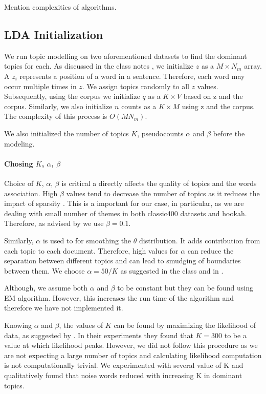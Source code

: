 \documentclass[11pt,a4paper,oneside]{article}
\begin{document}
Mention complexities of algorithms.

\subsection{LDA Initialization}
We run topic modelling on two aforementioned datasets to find the dominant topics for each. As discussed in the class notes \cite{classNotes}, we initialize $z$ as a $M \times N_m$ array. A $z_i$ represents a position of a word in a sentence. Therefore, each word may occur multiple times in $z$. We assign topics randomly to all $z$ values.  Subsequently, using the corpus we initialize $q$ as a $K \times V$ based on z and the corpus. Similarly, we also initialize $n$ counts as a $K \times M$ using z and the corpus. The complexity of this process is $O(MN_m)$.

We also initialized the number of topics $K$, pseudocounts $\alpha$ and $\beta$ before the modeling.

\paragraph{Chosing $K$, $\alpha$, $\beta$}
Choice of $K$, $\alpha$, $\beta$ is critical a directly affects the quality of topics and the words association. High $\beta$ values tend to decrease the number of topics as it reduces the impact of sparsity \cite{griffiths2004finding}. This is a important for our case, in particular, as we are dealing with small number of themes in both classic400 datasets and hookah. Therefore, as advised by \cite{griffiths2004finding} we use $\beta = 0.1$. 

Similarly, $\alpha$ is used to for smoothing the $\theta$ distribution. It adds contribution from each topic to each document. Therefore, high values for $\alpha$ can reduce the separation between different topics and can lead to smudging of boundaries between them. We choose $\alpha = 50/K$ as suggested in the class and in \cite{griffiths2004finding}.

Although, we assume both $\alpha$ and $\beta$ to be constant but they can be found using EM algorithm. However, this increases the run time of the algorithm and therefore we have not implemented it.

Knowing $\alpha$ and $\beta$, the values of $K$ can be found by maximizing the likelihood of data, as suggested by \cite{griffiths2004finding}. In their experiments they found that $K = 300$ to be a value at which likelihood peaks. However, we did not follow this procedure as we are not expecting a large number of topics and calculating likelihood computation is not computationally trivial. We experimented with several value of K and qualitatively found that noise words reduced with increasing K in dominant topics.
\end{document}
